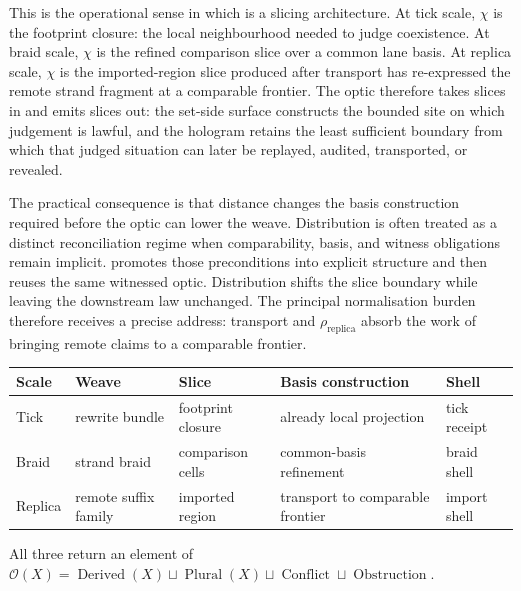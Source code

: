 \documentclass{aion}
\begin{document}
This is the operational sense in which \WARP{} is a slicing architecture. At
tick scale, \(\chi\) is the footprint closure: the local neighbourhood needed
to judge coexistence. At braid scale, \(\chi\) is the refined comparison slice
over a common lane basis. At replica scale, \(\chi\) is the imported-region
slice produced after transport has re-expressed the remote strand fragment at a
comparable frontier. The optic therefore takes slices in and emits slices out:
the set-side surface constructs the bounded site on which judgement is lawful,
and the hologram retains the least sufficient boundary from which that judged
situation can later be replayed, audited, transported, or revealed.

The practical consequence is that distance changes the basis construction
required before the optic can lower the weave. Distribution is often treated
as a distinct reconciliation regime when comparability, basis, and witness
obligations remain implicit. \WARP{} promotes those preconditions into explicit
structure and then reuses the same witnessed optic.
Distribution shifts the slice boundary while leaving the downstream law
unchanged. The principal normalisation burden therefore receives a precise address: transport and
\(\rho_{\mathrm{replica}}\) absorb the work of bringing remote claims to a
comparable frontier.

\begin{center}
	\scriptsize
	\setlength{\tabcolsep}{3pt}
	\AIONTableStyleOn
	\begin{tabularx}{\textwidth}{@{}>{\raggedright\arraybackslash}p{} >{\raggedright\arraybackslash}p{} >{\raggedright\arraybackslash}p{} >{\raggedright\arraybackslash}p{} X@{}}
		\toprule
		\AIONTableHead
		Scale   & Weave                & Slice             & Basis construction               & Shell        \\
		\midrule
		Tick    & rewrite bundle       & footprint closure & already local projection         & tick receipt \\
		Braid   & strand braid         & comparison cells  & common-basis refinement          & braid shell  \\
		Replica & remote suffix family & imported region   & transport to comparable frontier & import shell \\
		\bottomrule
	\end{tabularx}
	\AIONTableStyleOff
\end{center}

All three return an element of
\(\mathcal{O}(X)=\operatorname{Derived}(X)\sqcup\operatorname{Plural}(X)\sqcup\operatorname{Conflict}\sqcup\operatorname{Obstruction}\).
\end{document}
